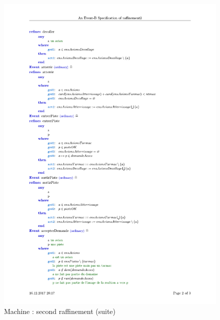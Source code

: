 \begin{figure}[H]
	\begin{center}	
	
		\includegraphics[scale=0.75]{images/2/raf22.pdf}
		\caption{ Machine : second raffinement (suite)}
		\label{raf22}
	\end{center}
\end{figure}


